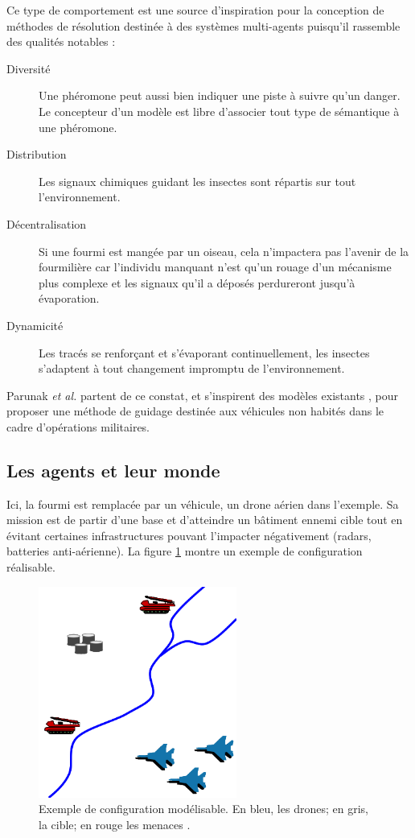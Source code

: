 \documentclass[12pt]{article}
\begin{document}
Ce type de comportement est une source d'inspiration pour la
conception de méthodes de résolution destinée à des systèmes
multi-agents puisqu'il rassemble des qualités notables \cite{dorigo}
:

\begin{description}
\item[Diversité]{Une phéromone peut aussi bien indiquer une piste à
  suivre qu'un danger. Le concepteur d'un modèle est libre d'associer
  tout type de sémantique à une phéromone.}
\item[Distribution]{Les signaux chimiques guidant les insectes sont
  répartis sur tout l'environnement.}
\item[Décentralisation]{Si une fourmi est mangée par un oiseau, cela
  n'impactera pas l'avenir de la fourmilière car l'individu manquant
  n'est qu'un rouage d'un mécanisme plus complexe et les signaux qu'il
  a déposés perdureront jusqu'à évaporation.}
\item[Dynamicité]{Les tracés se renforçant et s'évaporant
  continuellement, les insectes s'adaptent à tout changement impromptu
  de l'environnement.}
\end{description}

Parunak \textit{et al.} partent de ce constat, et s'inspirent des
modèles existants \cite{swarm}, pour proposer une méthode de guidage
destinée aux véhicules non habités dans le cadre d'opérations
militaires.

\subsection{Les agents et leur monde}

Ici, la fourmi est remplacée par un véhicule, un drone aérien dans
l'exemple. Sa mission est de partir d'une base et d'atteindre un
bâtiment ennemi cible tout en évitant certaines infrastructures
pouvant l'impacter négativement (radars, batteries anti-aérienne). La
figure \ref{real} montre un exemple de configuration réalisable.

\begin{figure}[H]
  \centering

  \includegraphics[width=6.5cm]{terrain_real.png}

  \caption{Exemple de configuration modélisable. En bleu, les drones;
    en gris, la cible; en rouge les menaces \cite{parunak}.}
  \label{real}
\end{figure}
\end{document}

